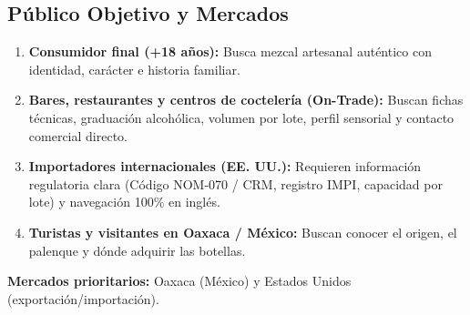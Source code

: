 \documentclass[11pt,letterpaper]{article}
\begin{document}
\subsection{Público Objetivo y Mercados}
\begin{enumerate}[leftmargin=1.5em]
    \item \textbf{Consumidor final (+18 años):} Busca mezcal artesanal auténtico con identidad, carácter e historia familiar.
    \item \textbf{Bares, restaurantes y centros de coctelería (On-Trade):} Buscan fichas técnicas, graduación alcohólica, volumen por lote, perfil sensorial y contacto comercial directo.
    \item \textbf{Importadores internacionales (EE. UU.):} Requieren información regulatoria clara (Código NOM-070 / CRM, registro IMPI, capacidad por lote) y navegación 100\% en inglés.
    \item \textbf{Turistas y visitantes en Oaxaca / México:} Buscan conocer el origen, el palenque y dónde adquirir las botellas.
\end{enumerate}
\textbf{Mercados prioritarios:} Oaxaca (México) y Estados Unidos (exportación/importación).
\end{document}
